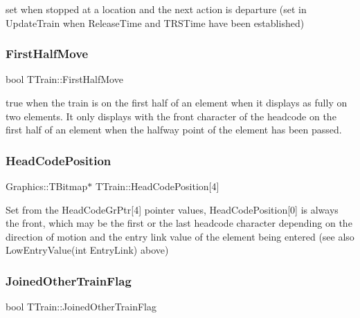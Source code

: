 set when stopped at a location and the next action is departure (set in Update\+Train when Release\+Time and T\+R\+S\+Time have been established) \mbox{\label{class_t_train_a638de0cfb04b13fb28edd5e61d2d628f}} 
\subsubsection{\texorpdfstring{First\+Half\+Move}{FirstHalfMove}}
{\footnotesize\ttfamily bool T\+Train\+::\+First\+Half\+Move\hspace{0.3cm}{\ttfamily [private]}}

true when the train is on the first half of an element when it displays as fully on two elements. It only displays with the front character of the headcode on the first half of an element when the halfway point of the element has been passed. \mbox{\label{class_t_train_a9b4cfd30341ab156b539eb3a5a9fe7a3}} 
\subsubsection{\texorpdfstring{Head\+Code\+Position}{HeadCodePosition}}
{\footnotesize\ttfamily Graphics\+::\+T\+Bitmap$\ast$ T\+Train\+::\+Head\+Code\+Position\mbox{[}4\mbox{]}\hspace{0.3cm}{\ttfamily [private]}}

Set from the Head\+Code\+Gr\+Ptr\mbox{[}4\mbox{]} pointer values, Head\+Code\+Position\mbox{[}0\mbox{]} is always the front, which may be the first or the last headcode character depending on the direction of motion and the entry link value of the element being entered (see also Low\+Entry\+Value(int Entry\+Link) above) \mbox{\label{class_t_train_a843a31af1c4faec4d71a61d32d6f4510}} 
\subsubsection{\texorpdfstring{Joined\+Other\+Train\+Flag}{JoinedOtherTrainFlag}}
{\footnotesize\ttfamily bool T\+Train\+::\+Joined\+Other\+Train\+Flag\hspace{0.3cm}{\ttfamily [private]}}

